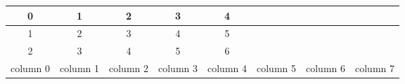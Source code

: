 \documentclass[12pt]{article}
\begin{document}
 
\begin{tabular}{ |c|c|c|c|c|c|c|c| } 
\hline 
0 & 1 & 2 & 3 & 4 \\
\hline 
1 & 2 & 3 & 4 & 5 \\
\hline 
2 & 3 & 4 & 5 & 6 \\
\hline 
column 0 & column 1 & column 2 & column 3 & column 4 & column 5 & column 6 & column 7 \\
\hline 
\end{tabular}
\end{document}
